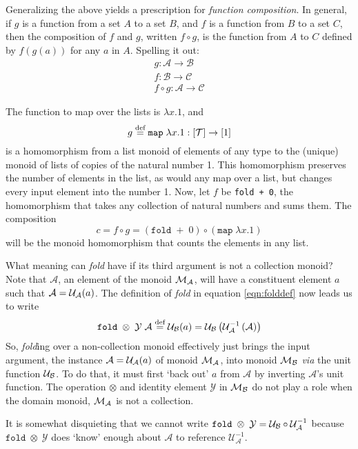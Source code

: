 Generalizing the above yields a prescription for \emph{function composition}. In general, if $g$ is a function from a set $A$ to a set $B$, and $f$ is a function from $B$ to a set $C$, then the composition of $f$ and $g$, written $f\circ g$, is the function from $A$ to $C$ defined by $f(g(a))$ for any $a$ in $A$. Spelling it out:
\begin{align*}
  g:\mathcal{A}\rightarrow\mathcal{B}\\
  f:\mathcal{B}\rightarrow\mathcal{C}\\
  f\circ g:\mathcal{A}\rightarrow\mathcal{C}
\end{align*}


The function to map over the lists is $\lambda x.1$, and $$g\overset{\text{def}}{=}\mathtt{map}\;\lambda x.1:[\mathcal{T}]\rightarrow[1]$$ is a homomorphism from a list monoid of elements of any type to the (unique) monoid of lists of copies of the natural number 1. This homomorphism preserves the number of elements in the list, as would any map over a list, but changes every input element into the number 1. Now, let $f$ be \verb"fold + 0", the homomorphism that takes any collection of natural numbers and sums them. The composition
\[  
  c=f\circ g= (\mathtt{fold}\;+\;0) \circ (\mathtt{map}\;\lambda x.1)  
\]
will be the monoid homomorphism that counts the elements in any list. 


What meaning can \emph{fold} have if its third argument is not a collection monoid? Note that $\mathcal{A}$, an element of the monoid $\mathcal{M}_{\mathcal{A}}$, will have a constituent element $a$ such that  $\mathcal{A}=\mathcal{U}_{\mathcal{A}}(a)$. The definition of \emph{fold} in equation \ref{eqn:folddef} now leads us to write
\begin{equation}
  \mathtt{fold}\;\otimes\;\mathcal{Y}\;\mathcal{A} \overset{\text{def}}{=}
        \mathcal{U}_{\mathcal{B}}(a)=
        \mathcal{U}_{\mathcal{B}}\left({\mathcal{U}}^{-1}_{\mathcal{A}}
        \left(\mathcal{A}\right)\right)
  \label{eqn:foldnoncollectiondef}
\end{equation}
So, \emph{fold}ing over a non-collection monoid effectively just brings the input argument, the instance $\mathcal{A}=\mathcal{U}_{\mathcal{A}}(a)$ of monoid $\mathcal{M}_{\mathcal{A}}$, into monoid $\mathcal{M}_{\mathcal{B}}$ \emph{via} the unit function $\mathcal{U}_{\mathcal{B}}$. To do that, it must first `back out' $a$ from $\mathcal{A}$ by inverting $\mathcal{A}$'s unit function. The operation $\otimes$ and identity element $\mathcal{Y}$ in $\mathcal{M}_{\mathcal{B}}$ do not play a role when the domain monoid, $\mathcal{M}_{\mathcal{A}}$ is not a collection. 


It is somewhat disquieting that we cannot write $\mathtt{fold}\;\otimes\;\mathcal{Y} = 
\mathcal{U}_{\mathcal{B}}\circ{\mathcal{U}}^{-1}_{\mathcal{A}}$ 
because $\mathtt{fold}\;\otimes\;\mathcal{Y}$ does `know' enough about $\mathcal{A}$ to reference ${\mathcal{U}}^{-1}_{\mathcal{A}}$.


